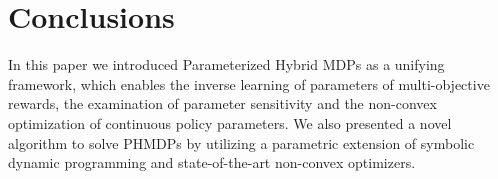 \section{Conclusions}
\label{sec:conclusion}

In this paper we introduced Parameterized Hybrid MDPs as a unifying framework, which enables the inverse learning of parameters of multi-objective rewards, the examination of parameter sensitivity and the non-convex optimization of continuous policy parameters. We also presented a novel algorithm to solve PHMDPs by utilizing a parametric extension of symbolic dynamic programming and state-of-the-art non-convex optimizers. 

